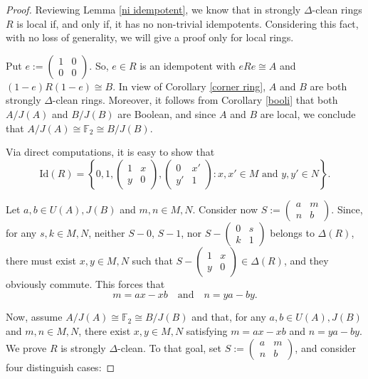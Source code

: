 \documentclass[10pt,a4paper]{amsart}
\begin{document}
\begin{proof}
Reviewing Lemma \ref{ni idempotent}, we know that in strongly $\Delta$-clean rings $R$ is local if, and only if, it has no non-trivial idempotents. Considering this fact, with no loss of generality, we will give a proof only for local rings.

Put $e :=\begin{pmatrix}
1 & 0 \\
0 & 0
\end{pmatrix}$. So, $e \in R$ is an idempotent with $eRe \cong A$ and $(1-e)R(1-e) \cong B$. In view of Corollary \ref{corner ring}, $A$ and $B$ are both strongly $\Delta$-clean rings. Moreover, it follows from Corollary \ref{booli} that both $A/J(A)$ and $B/J(B)$ are Boolean, and since $A$ and $B$ are local, we conclude that $A/J(A) \cong  \mathbb{F}_2  \cong B/J(B)$.

Via direct computations, it is easy to show that
\[
\text{Id}(R) = \left\{0,1, \begin{pmatrix}
1 & x \\
y & 0
\end{pmatrix},
\begin{pmatrix}
0 & x' \\
y' & 1
\end{pmatrix} : x,x' \in M \text{ and } y,y' \in N\right\}.
\]

Let $a,b \in U(A),J(B)$ and $m,n \in M,N$. Consider now $S :=\begin{pmatrix}
a & m \\
n & b
\end{pmatrix}$. Since, for any $s,k \in M,N$, neither $S-0$, $S-1$, nor $S-\begin{pmatrix}
0 & s \\
k & 1
\end{pmatrix}$ belongs to $\Delta(R)$, there must exist $x,y \in M,N$ such that $S-\begin{pmatrix}
1 & x \\
y & 0
\end{pmatrix} \in \Delta(R)$, and they obviously commute. This forces that
\[
m = ax - xb \quad \text{and} \quad n = ya - by.
\]

Now, assume $A/J(A) \cong  \mathbb{F}_2  \cong B/J(B)$ and that, for any $a,b \in U(A),J(B)$ and $m,n \in M,N$, there exist $x,y \in M,N$ satisfying $m=ax-xb$ and $n=ya-by$. We prove $R$ is strongly $\Delta$-clean. To that goal, set $S :=\begin{pmatrix}
a & m \\
n & b
\end{pmatrix}$, and consider four distinguish cases:


\end{proof}
\end{document}
